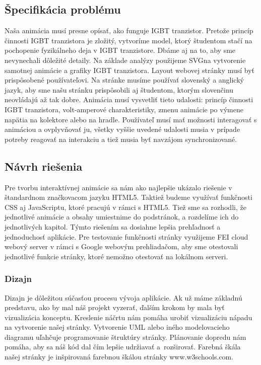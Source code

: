 \subsection{Špecifikácia problému}
Naša animácia musí presne opísať, ako funguje \acrshort{IGBT} tranzistor. Pretože princíp činnosti \acrshort{IGBT} tranzistora je zložitý, vytvoríme model, ktorý študentom stačí na pochopenie fyzikálneho deja v \acrshort{IGBT} tranzistore. Dbáme aj na to, aby sme nevynechali dôležité detaily. Na základe analýzy použijeme \acrshort{SVG}na vytvorenie samotnej animácie a grafiky \acrshort{IGBT} tranzistora. Layout webovej stránky musí byť prispôsobené používateľovi. Na stránke musíme používať slovenský a anglický jazyk, aby sme našu stránku prispôsobili aj študentom, ktorým slovenčinu neovládajú až tak dobre.  Animácia musí vysvetliť tieto udalosti:  princíp činnosti \acrshort{IGBT} tranzistora, volt-amperové charakteristiky, zmenu animácie po výmene napätia na kolektore alebo na hradle. Používateľ musí mať možnosti interagovať s animáciou a ovplyvňovať ju, všetky vyššie uvedené udalosti musia v prípade potreby reagovať na interakciu a tiež musia byť navzájom synchronizované.

\subsection{Návrh riešenia}
Pre tvorbu interaktívnej animácie sa nám ako najlepšie ukázalo riešenie v štandardnom značkovacom jazyku HTML5. Taktiež budeme využívať funkčnosti CSS aj JavaScriptu, ktoré pracujú v rámci s HTML5. Tiež sme sa rozhodli, že jednotlivé animácie a obsahy umiestnime do podstránok, a rozdelíme ich do jednotlivých kapitol. Týmto riešením sa dosiahne lepšia prehľadnosť a jednoduchosť aplikácie. Pre testovanie funkčnosti stránky využijeme \acrshort{FEI} cloud webový server v rámci s Google webovým prehliadačom, aby sme otestovali jednotlivé funkcie stránky, ktoré  nemožno otestovať na lokálnom serveri.

\subsubsection{Dizajn}
Dizajn je dôležitou súčasťou procesu vývoja aplikácie. Ak už máme základnú predstavu, ako by mal náš projekt vyzerať, ďalším krokom by mala byť vizualizácia konceptu. Kreslenie náčrtu nám pomáha urobiť vizualizáciu nápadu na vytvorenie našej stránky. Vytvorenie UML alebo iného modelovacieho diagramu uľahčuje programovanie štruktúry stránky. Plánovanie dopredu nám pomáha, aby sa náš kód dal čím lepšie udržiavať a rozširovať. Farebná škála našej stránky je inšpirovaná farebnou škálou stránky www.w3schools.com.

